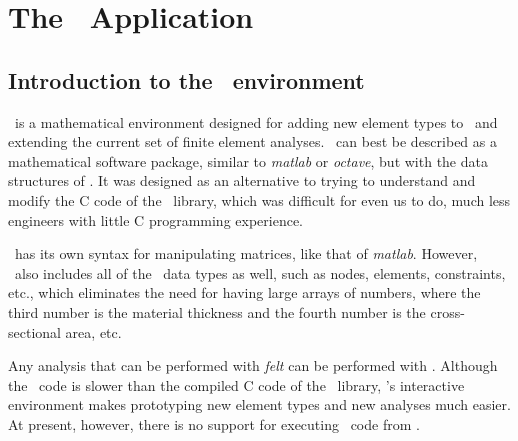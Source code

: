 
\newcommand{\adddef}{{\tt add\_definition()}}
\newcommand{\remdef}{{\tt remove\_definition()}}
\newcommand{\rl}{{\tt readline}}

\newpage{\pagestyle{empty}\cleardoublepage}

\chapter{The \burlap\ Application}
\label{burlap.application}

\section{Introduction to the \burlap\ environment}
\label{burlap.intro}

\burlap\ is a mathematical environment designed for adding new element
types to \felt\ and extending the current set of finite element
analyses.  \burlap\ can best be described as a mathematical software
package, similar to {\em matlab} or {\em octave}, but with the data
structures of \felt.  It was designed as an alternative to trying to
understand and modify the C code of the \felt\ library, which was
difficult for even us to do, much less engineers with little C
programming experience.

\burlap\ has its own syntax for manipulating matrices, like that of
{\em matlab}.  However, \burlap\ also includes all of the \felt\ data
types as well, such as nodes, elements, constraints, etc., which
eliminates the need for having large arrays of numbers, where the
third number is the material thickness and the fourth number is the
cross-sectional area, etc.

Any analysis that can be performed with {\em felt} can be performed
with \burlap.  Although the \burlap\ code is slower than the compiled
C code of the \felt\ library, \burlap's interactive environment makes
prototyping new element types and new analyses much easier.  At
present, however, there is no support for executing \burlap\ code from
\velvet.


